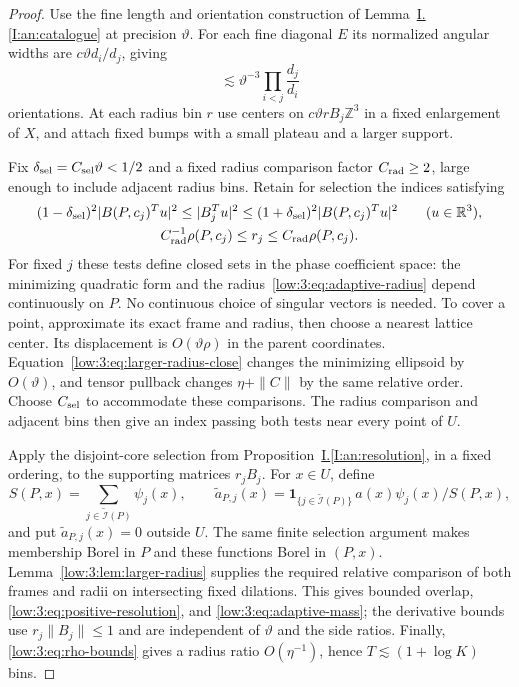 \documentclass[11pt]{amsart}
\theoremstyle{definition}
\theoremstyle{remark}
\numberwithin{equation}{section}
\newcommand{\partIref}[1]{\hyperref[I:#1]{I.\ref*{I:#1}}}
\begin{document}
\begin{proof}
Use the fine length and orientation construction of Lemma~\partIref{an:catalogue} at precision $\vartheta$. For each fine diagonal $E$ its normalized angular widths are $c\vartheta d_i/d_j$, giving
\begin{equation}\label{low:3:eq:orientation-count}
\lesssim\vartheta^{-3}\prod_{i<j}\frac{d_j}{d_i}
\end{equation}
orientations. At each radius bin $r$ use centers on $c\vartheta rB_j\mathbb Z^3$ in a fixed enlargement of $X$, and attach fixed bumps with a small plateau and a larger support.

Fix $\delta_{\rm sel}=C_{\rm sel}\vartheta<1/2$ and a fixed radius comparison factor $C_{\rm rad}\ge2$, large enough to include adjacent radius bins. Retain for selection the indices satisfying
\[
\begin{gathered}
(1-\delta_{\rm sel})^2|B(P,c_j)^Tu|^2\le|B_j^Tu|^2\le(1+\delta_{\rm sel})^2|B(P,c_j)^Tu|^2\qquad(u\in\mathbb R^3),\\
C_{\rm rad}^{-1}\rho(P,c_j)\le r_j\le C_{\rm rad}\rho(P,c_j).
\end{gathered}
\]
For fixed $j$ these tests define closed sets in the phase coefficient space: the minimizing quadratic form and the radius~\eqref{low:3:eq:adaptive-radius} depend continuously on $P$. No continuous choice of singular vectors is needed. To cover a point, approximate its exact frame and radius, then choose a nearest lattice center. Its displacement is $O(\vartheta\rho)$ in the parent coordinates. Equation~\eqref{low:3:eq:larger-radius-close} changes the minimizing ellipsoid by $O(\vartheta)$, and tensor pullback changes $\eta+\|C\|$ by the same relative order. Choose $C_{\rm sel}$ to accommodate these comparisons. The radius comparison and adjacent bins then give an index passing both tests near every point of $U$.

Apply the disjoint-core selection from Proposition~\partIref{an:resolution}, in a fixed ordering, to the supporting matrices $r_jB_j$. For $x\in U$, define
\[
S(P,x)=\sum_{j\in\widetilde{\mathcal I}(P)}\psi_j(x),\qquad \widetilde a_{P,j}(x)=\mathbf1_{\{j\in\widetilde{\mathcal I}(P)\}}\,a(x)\psi_j(x)/S(P,x),
\]
and put $\widetilde a_{P,j}(x)=0$ outside $U$. The same finite selection argument makes membership Borel in $P$ and these functions Borel in $(P,x)$. Lemma~\ref{low:3:lem:larger-radius} supplies the required relative comparison of both frames and radii on intersecting fixed dilations. This gives bounded overlap, \eqref{low:3:eq:positive-resolution}, and \eqref{low:3:eq:adaptive-mass}; the derivative bounds use $r_j\|B_j\|\le1$ and are independent of $\vartheta$ and the side ratios. Finally, \eqref{low:3:eq:rho-bounds} gives a radius ratio $O(\eta^{-1})$, hence $T\lesssim (1+\log K)$ bins.
\end{proof}
\end{document}
